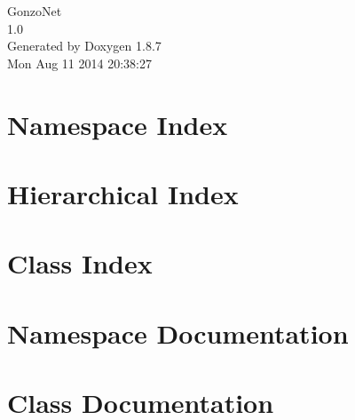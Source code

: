 \documentclass[twoside]{book}
\newcommand{\+}{\discretionary{\mbox{\scriptsize$\hookleftarrow$}}{}{}}
\newcommand{\clearemptydoublepage}{%
  \newpage{\pagestyle{empty}\cleardoublepage}%
}
\begin{document}
\hypersetup{pageanchor=false,
             bookmarks=true,
             bookmarksnumbered=true,
             pdfencoding=unicode
            }
\begin{titlepage}
\vspace*{7cm}
\begin{center}%
{\Large Gonzo\+Net \\[1ex]\large 1.\+0 }\\
\vspace*{1cm}
{\large Generated by Doxygen 1.8.7}\\
\vspace*{0.5cm}
{\small Mon Aug 11 2014 20:38:27}\\
\end{center}
\end{titlepage}
\clearemptydoublepage
\tableofcontents
\clearemptydoublepage
{}
\hypersetup{pageanchor=true}

\chapter{Namespace Index}

\chapter{Hierarchical Index}

\chapter{Class Index}

\chapter{Namespace Documentation}






\chapter{Class Documentation}


















\newpage
{}
{}
\printindex
\end{document}
